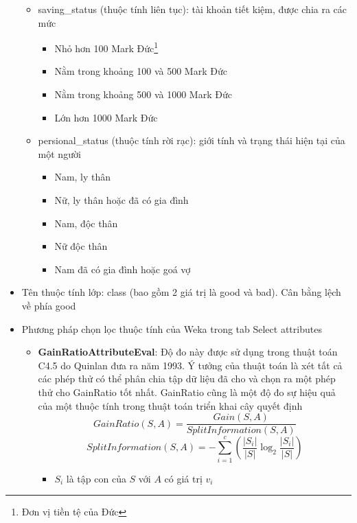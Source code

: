 \documentclass[a4paper, 12pt]{article}
\begin{document}
\begin{itemize}
\begin{itemize}
        \item saving\_status (thuộc tính liên tục): tài khoản tiết kiệm, được chia ra các mức
        \begin{itemize}
            \item Nhỏ hơn 100 Mark Đức\footnote{Đơn vị tiền tệ của Đức}
            \item Nằm trong khoảng 100 và 500 Mark Đức
            \item Nằm trong khoảng 500 và 1000 Mark Đức
            \item Lớn hơn 1000 Mark Đức
        \end{itemize}

        \item persional\_status (thuộc tính rời rạc): giới tính và trạng thái hiện tại của một người
        \begin{itemize}
            \item Nam, ly thân
            \item Nữ, ly thân hoặc đã có gia đình
            \item Nam, độc thân
            \item Nữ độc thân
            \item Nam đã có gia đình hoặc goá vợ
        \end{itemize}
    \end{itemize}

    \item Tên thuộc tính lớp: class (bao gồm 2 giá trị là good và bad). Cân bằng lệch về phía good

    \item Phương pháp chọn lọc thuộc tính của Weka trong tab Select attributes
    \begin{itemize}
        \item \textbf{GainRatioAttributeEval}: Độ đo này được sử dụng trong thuật toán C4.5 do Quinlan đưa ra năm 1993. Ý tưởng của thuật toán là xét tất cả các phép thử có thể phân chia tập dữ liệu đã cho và chọn ra một phép thử cho GainRatio tốt nhất. GainRatio cũng là một độ đo sự hiệu quả của một thuộc tính trong thuật toán triển khai cây quyết định 
        $$GainRatio(S, A) = \frac{Gain(S, A)}{SplitInformation(S, A)}$$ $$SplitInformation(S, A) = -  \sum_{i=1}^{c} (\frac{|S_i|}{|S|} \log_2 \frac{|S_i|}{|S|})$$
        \begin{itemize}
            \item $S_i$ là tập con của $S$ với $A$ có giá trị $v_i$
        \end{itemize}


\end{itemize}
\end{itemize}
\end{document}
